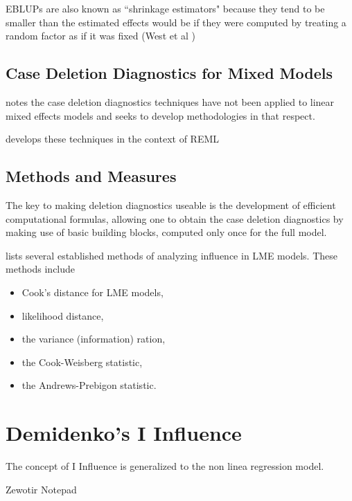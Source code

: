 \documentclass[12pt, a4paper]{article}
\begin{document}
EBLUPs are also known as ``shrinkage estimators" because they tend to be smaller than the estimated effects would be if they were computed by treating a random factor as if it was fixed (West et al )







\subsection{Case Deletion Diagnostics for Mixed Models}

\citet{Christiansen} notes the case deletion diagnostics techniques have not been applied to linear mixed effects models and seeks to develop methodologies in that respect.

\citet{Christiansen} develops these techniques in the context of REML

\subsection{Methods and Measures}
The key to making deletion diagnostics useable is the development of efficient computational formulas, allowing one to obtain the  case deletion diagnostics by making use of basic building blocks, computed only once for the full model.

\citet{Zewotir} lists several established methods of analyzing influence in LME models. These methods include \begin{itemize}
	\item Cook's distance for LME models,
	\item {} likelihood distance,
	\item the variance (information) ration,
	\item the  Cook-Weisberg statistic,
	\item the  Andrews-Prebigon statistic.
\end{itemize}




\section{Demidenko's I Influence} %
The concept of I Influence is generalized  to the non linea regression model.




Zewotir Notepad
\end{document}
